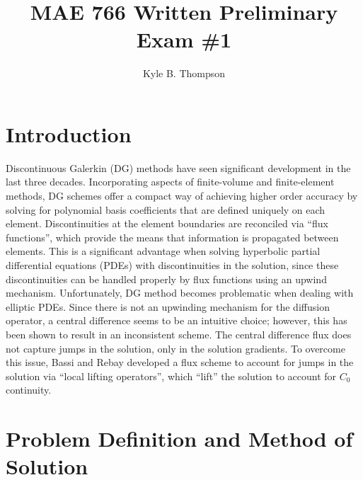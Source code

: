 \documentclass[a4paper]{article}
\title{MAE 766 Written Preliminary Exam \#1}
\author{ Kyle B. Thompson }
\begin{document}
\maketitle

\section{Introduction}
Discontinuous Galerkin (DG) methods have seen significant development in the last
three decades.  Incorporating aspects of finite-volume and finite-element
methods, DG schemes offer a compact way of achieving higher order accuracy by
solving for polynomial basis coefficients that are defined uniquely on each
element.  Discontinuities at the element boundaries are reconciled via ``flux
functions'', which provide the means that information is propagated between
elements.  This is a significant advantage when solving hyperbolic partial
differential equations (PDEs) with discontinuities in the solution, since these
discontinuities can be handled properly by flux functions using an upwind
mechanism.  Unfortunately, DG method becomes problematic when dealing with
elliptic PDEs.  Since there is not an upwinding mechanism for the diffusion
operator, a central difference seems to be an intuitive choice; however, this
has been shown to result in an inconsistent scheme. The central difference flux
does not capture jumps in the solution, only in the solution gradients.  To
overcome this issue, Bassi and Rebay developed a flux scheme\cite{br2} to account for
jumps in the solution via ``local lifting operators'', which ``lift'' the
solution to account for $C_0$ continuity.

\section{Problem Definition and Method of Solution}
\end{document}
